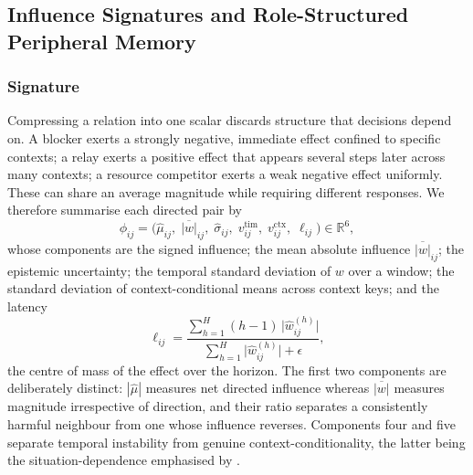 \documentclass[conference]{IEEEtran}
\begin{document}
\subsection{Influence Signatures and Role-Structured Peripheral Memory}

\subsubsection{Signature}
Compressing a relation into one scalar discards structure that decisions depend on. A blocker exerts a strongly negative, immediate effect confined to specific contexts; a relay exerts a positive effect that appears several steps later across many contexts; a resource competitor exerts a weak negative effect uniformly. These can share an average magnitude while requiring different responses. We therefore summarise each directed pair by
\begin{equation}
\phi_{ij}=\big(\hat\mu_{ij},\;\overline{|w|}_{ij},\;\hat\sigma_{ij},\;v^{\mathrm{tim}}_{ij},\;v^{\mathrm{ctx}}_{ij},\;\ell_{ij}\big)\in\mathbb{R}^{6},
\label{eq:signature}
\end{equation}
whose components are the signed influence; the mean absolute influence $\overline{|w|}_{ij}$; the epistemic uncertainty; the temporal standard deviation of $w$ over a window; the standard deviation of context-conditional means across context keys; and the latency
\begin{equation}
\ell_{ij}=\frac{\sum_{h=1}^{H}(h-1)\,\big|\hat{w}^{(h)}_{ij}\big|}{\sum_{h=1}^{H}\big|\hat{w}^{(h)}_{ij}\big|+\epsilon},
\label{eq:latency}
\end{equation}
the centre of mass of the effect over the horizon. The first two components are deliberately distinct: $|\hat\mu|$ measures net directed influence whereas $\overline{|w|}$ measures magnitude irrespective of direction, and their ratio separates a consistently harmful neighbour from one whose influence reverses. Components four and five separate temporal instability from genuine context-conditionality, the latter being the situation-dependence emphasised by \cite{du2024scic, seitzer2021cai}.
\end{document}
